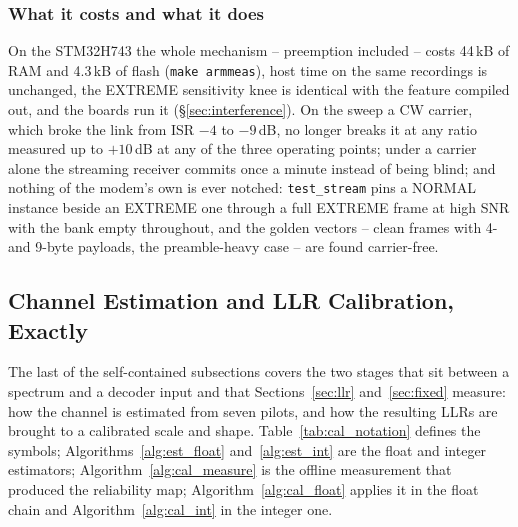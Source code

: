 \subsubsection*{What it costs and what it does}

On the STM32H743 the whole mechanism -- preemption included -- costs
44\,kB of RAM and 4.3\,kB of flash (\texttt{make armmeas}), host time
on the same recordings is unchanged, the EXTREME sensitivity knee is
identical with the feature compiled out, and the boards run it
(\S\ref{sec:interference}).  On the sweep a CW carrier, which broke
the link from ISR $-4$ to $-9$\,dB, no longer breaks it at any ratio
measured up to $+10$\,dB at any of the three operating points; under a
carrier alone the streaming receiver commits once a minute instead of
being blind; and nothing of the modem's own is ever notched:
\texttt{test\_stream} pins a NORMAL instance beside an EXTREME one
through a full EXTREME frame at high SNR with the bank empty
throughout, and the golden vectors -- clean frames with 4- and
9-byte payloads, the preamble-heavy case -- are found carrier-free.

\subsection{Channel Estimation and LLR Calibration, Exactly}
\label{sec:est_cal_exact}

The last of the self-contained subsections covers the two stages that
sit between a spectrum and a decoder input and that
Sections~\ref{sec:llr} and~\ref{sec:fixed} measure: how the channel is
estimated from seven pilots, and how the resulting LLRs are brought to
a calibrated scale and shape.  Table~\ref{tab:cal_notation} defines the
symbols; Algorithms~\ref{alg:est_float} and~\ref{alg:est_int} are the
float and integer estimators; Algorithm~\ref{alg:cal_measure} is the
offline measurement that produced the reliability map;
Algorithm~\ref{alg:cal_float} applies it in the float chain and
Algorithm~\ref{alg:cal_int} in the integer one.

